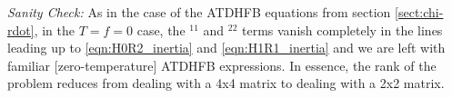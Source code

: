 \noindent\textit{Sanity Check:} As in the case of the ATDHFB equations from section \ref{sect:chi-rdot}, in the $T=f=0$ case, the $^{11}$ and $^{22}$ terms vanish completely in the lines leading up to \ref{eqn:H0R2_inertia} and \ref{eqn:H1R1_inertia} and we are left with familiar [zero-temperature] ATDHFB expressions. In essence, the rank of the problem reduces from dealing with a 4x4 matrix to dealing with a 2x2 matrix.



